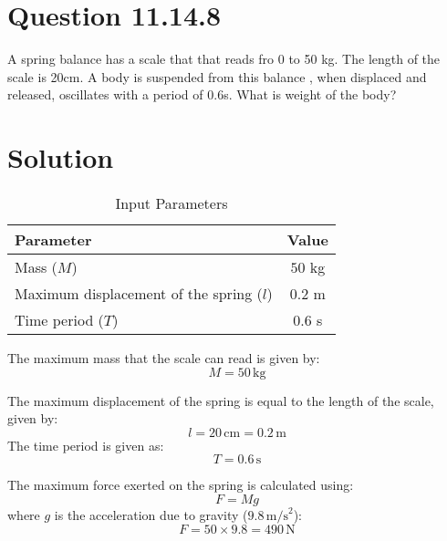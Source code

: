 \documentclass[journal,12pt,twocolumn]{IEEEtran}
\theoremstyle{remark}
\begin{document}
\section{Question 11.14.8}A spring balance has a scale that that reads fro 0 to 50 kg. The length of the scale is 20cm. A body is suspended from this balance , when displaced and released, oscillates with a period of 0.6s. What is weight of the body? 

\section{Solution}

\begin{table}[htbp]                                       \centering                                              \caption{Input Parameters}
  \label{tab:parameters}                                  \begin{tabular}{lc}                                       \toprule                                                \textbf{Parameter} & \textbf{Value} \\                  \midrule                                                Mass ($M$) & $50$ kg \\                                 Maximum displacement of the spring ($l$) & $0.2$ m \\                                                           Time period ($T$) & $0.6$ s \\                              \bottomrule                                           \end{tabular}                                         \end{table}


The maximum mass that the scale can read is given by:
\begin{equation}
M = 50 \, \text{kg}
\end{equation}

The maximum displacement of the spring is equal to the length of the scale, given by:
\begin{equation}
l = 20 \, \text{cm} = 0.2 \, \text{m}
\end{equation}
The time period is given as:
\begin{equation}
T = 0.6 \, \text{s}
\end{equation}

The maximum force exerted on the spring is calculated using:
\begin{equation}
F = Mg
\end{equation}
where \( g \) is the acceleration due to gravity (\( 9.8 \, \text{m/s}^2 \)):\
\begin{equation}
F = 50 \times 9.8 = 490 \, \text{N}
\end{equation}
\end{document}
